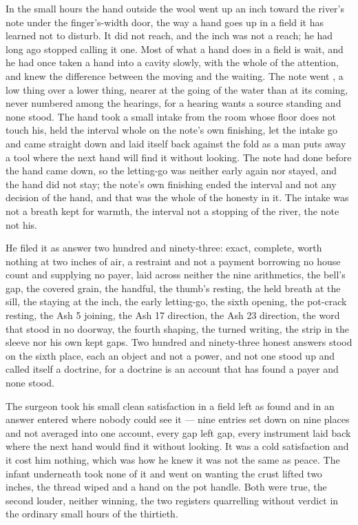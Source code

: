 \scenebreak

In the small hours the hand outside the wool went up an inch toward the river's note under the finger's-width door, the way a hand goes up in a field it has learned not to disturb. It did not reach, and the inch was not a reach; he had long ago stopped calling it one. Most of what a hand does in a field is wait, and he had once taken a hand into a cavity slowly, with the whole of the attention, and knew the difference between the moving and the waiting. The note went , a low thing over a lower thing, nearer at the going of the water than at its coming, never numbered among the hearings, for a hearing wants a source standing and none stood. The hand took a small intake from the room whose floor does not touch his, held the interval whole on the note's own finishing, let the intake go and came straight down and laid itself back against the fold as a man puts away a tool where the next hand will find it without looking. The note had done before the hand came down, so the letting-go was neither early again nor stayed, and the hand did not stay; the note's own finishing ended the interval and not any decision of the hand, and that was the whole of the honesty in it. The intake was not a breath kept for warmth, the interval not a stopping of the river, the note not his.

He filed it as answer two hundred and ninety-three: exact, complete, worth nothing at two inches of air, a restraint and not a payment borrowing no house count and supplying no payer, laid across neither the nine arithmetics, the bell's gap, the covered grain, the handful, the thumb's resting, the held breath at the sill, the staying at the inch, the early letting-go, the sixth opening, the pot-crack resting, the Ash 5 joining, the Ash 17 direction, the Ash 23 direction, the word that stood in no doorway, the fourth shaping, the turned writing, the strip in the sleeve nor his own kept gaps. Two hundred and ninety-three honest answers stood on the sixth place, each an object and not a power, and not one stood up and called itself a doctrine, for a doctrine is an account that has found a payer and none stood.

The surgeon took his small clean satisfaction in a field left as found and in an answer entered where nobody could see it --- nine entries set down on nine places and not averaged into one account, every gap left gap, every instrument laid back where the next hand would find it without looking. It was a cold satisfaction and it cost him nothing, which was how he knew it was not the same as peace. The infant underneath took none of it and went on wanting the crust lifted two inches, the thread wiped and a hand on the pot handle. Both were true, the second louder, neither winning, the two registers quarrelling without verdict in the ordinary small hours of the thirtieth.

